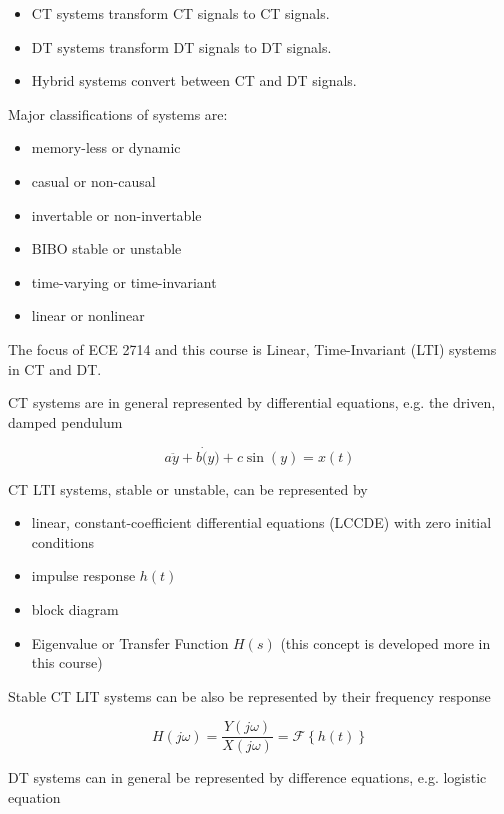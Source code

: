 \documentclass{article}
\begin{document}
\begin{itemize}
\item CT systems transform CT signals to CT signals.
\item DT systems transform DT signals to DT signals.
\item Hybrid systems convert between CT and DT signals.
\end{itemize}

Major classifications of systems are:

\begin{itemize}
\item memory-less or dynamic
\item casual or non-causal
\item invertable or non-invertable
\item BIBO stable or unstable
\item time-varying or time-invariant
\item linear or nonlinear
\end{itemize}

The focus of ECE 2714 and this course is Linear, Time-Invariant (LTI) systems in CT and DT.

CT systems are in general represented by differential equations, e.g. the driven, damped pendulum

\begin{equation}
  a\ddot{y} + b\dot(y) + c\sin(y) = x(t)
\end{equation}

CT LTI systems, stable or unstable, can be represented by

\begin{itemize}
\item linear, constant-coefficient differential equations (LCCDE) with zero initial conditions
\item impulse response $h(t)$
\item block diagram
\item Eigenvalue or Transfer Function $H(s)$ (this concept is developed more in this course)
\end{itemize}

Stable CT LIT systems can be also be represented by their frequency response

\begin{equation}
  H(j\omega) = \frac{Y(j\omega)}{X(j\omega)} = \mathcal{F} \left\{ h(t) \right\}
\end{equation}

DT systems can in general be represented by difference equations, e.g. logistic equation
\end{document}

